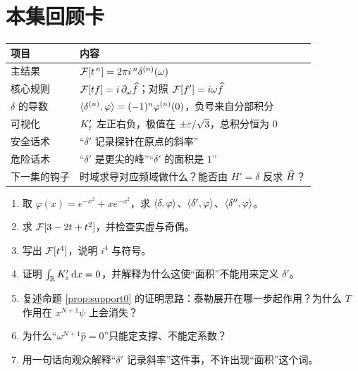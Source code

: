 \section{本集回顾卡}

\begin{center}
\small
\renewcommand{\arraystretch}{1.4}
\begin{tabularx}{\textwidth}{@{}L{3.4cm}Y@{}}
\toprule
项目 & 内容 \\
\midrule
主结果 & $\mathcal{F}[t^{\,n}]=2\pi i^{\,n}\delta^{(n)}(\omega)$ \\
核心规则 & $\mathcal{F}[tf]=i\,\partial_\omega\widehat{f}$；对照 $\mathcal{F}[f']=i\omega\widehat{f}$ \\
$\delta$ 的导数 & $\langle \delta^{(n)},\varphi\rangle=(-1)^{n}\varphi^{(n)}(0)$，负号来自分部积分 \\
可视化 & $K_\varepsilon'$ 左正右负，极值在 $\pm\varepsilon/\sqrt3$，总积分恒为 $0$ \\
安全话术 & “$\delta'$ 记录探针在原点的斜率” \\
危险话术 & “$\delta'$ 是更尖的峰”“$\delta'$ 的面积是 $1$” \\
下一集的钩子 & 时域求导对应频域做什么？能否由 $H'=\delta$ 反求 $\widehat{H}$？ \\
\bottomrule
\end{tabularx}
\end{center}

\begin{quizbox}[EP02 自测]
\begin{enumerate}[leftmargin=1.6em,itemsep=0.35em]
\item 取 $\varphi(x)=e^{-x^{2}}+xe^{-x^{2}}$，求 $\langle \delta,\varphi\rangle$、$\langle \delta',\varphi\rangle$、$\langle \delta'',\varphi\rangle$。
\item 求 $\mathcal{F}[3-2t+t^{2}]$，并检查实虚与奇偶。
\item 写出 $\mathcal{F}[t^{4}]$，说明 $i^{4}$ 与符号。
\item 证明 $\int_{\mathbb{R}}K_\varepsilon'\mathop{}\!\mathrm{d} x=0$，并解释为什么这使“面积”不能用来定义 $\delta'$。
\item 复述命题 \ref{prop:support0} 的证明思路：泰勒展开在哪一步起作用？为什么 $T$ 作用在 $x^{N+1}\psi$ 上会消失？
\item 为什么“$\omega^{N+1}\widehat p=0$”只能定支撑、不能定系数？
\item 用一句话向观众解释“$\delta'$ 记录斜率”这件事，不许出现“面积”这个词。
\end{enumerate}
\end{quizbox}
